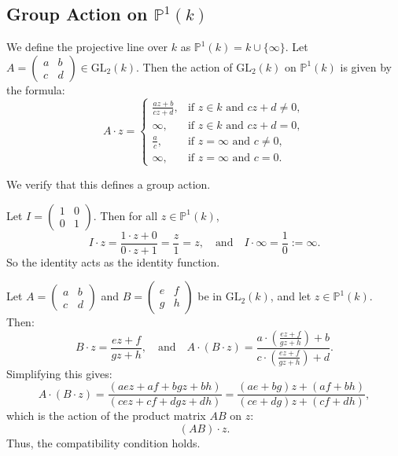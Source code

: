 \documentclass[12pt]{article}
\begin{document}
\subsection*{Group Action on \(\mathbb{P}^1(k)\)}

We define the projective line over \( k \) as \( \mathbb{P}^1(k) = k \cup \{\infty\} \). Let \( A = \begin{pmatrix} a & b \\ c & d \end{pmatrix} \in \mathrm{GL}_2(k) \). Then the action of \( \mathrm{GL}_2(k) \) on \( \mathbb{P}^1(k) \) is given by the formula:
\[
A \cdot z =
\begin{cases}
\displaystyle \frac{az + b}{cz + d}, & \text{if } z \in k \text{ and } cz + d \neq 0, \\
\infty, & \text{if } z \in k \text{ and } cz + d = 0, \\
\displaystyle \frac{a}{c}, & \text{if } z = \infty \text{ and } c \neq 0, \\
\infty, & \text{if } z = \infty \text{ and } c = 0.
\end{cases}
\]

We verify that this defines a group action.

Let \( I = \begin{pmatrix} 1 & 0 \\ 0 & 1 \end{pmatrix} \). Then for all \( z \in \mathbb{P}^1(k) \),
\[
I \cdot z = \frac{1 \cdot z + 0}{0 \cdot z + 1} = \frac{z}{1} = z, \quad \text{and} \quad I \cdot \infty = \frac{1}{0} := \infty.
\]
So the identity acts as the identity function.

Let \( A = \begin{pmatrix} a & b \\ c & d \end{pmatrix} \) and \( B = \begin{pmatrix} e & f \\ g & h \end{pmatrix} \) be in \( \mathrm{GL}_2(k) \), and let \( z \in \mathbb{P}^1(k) \). Then:
\[
B \cdot z = \frac{ez + f}{gz + h}, \quad \text{and} \quad A \cdot (B \cdot z) = \frac{a \cdot \left( \frac{ez + f}{gz + h} \right) + b}{c \cdot \left( \frac{ez + f}{gz + h} \right) + d}.
\]
Simplifying this gives:
\[
A \cdot (B \cdot z) = \frac{(aez + af + bgz + bh)}{(cez + cf + dgz + dh)} = \frac{(ae + bg)z + (af + bh)}{(ce + dg)z + (cf + dh)},
\]
which is the action of the product matrix \( AB \) on \( z \):
\[
(AB) \cdot z.
\]
Thus, the compatibility condition holds.
\end{document}
